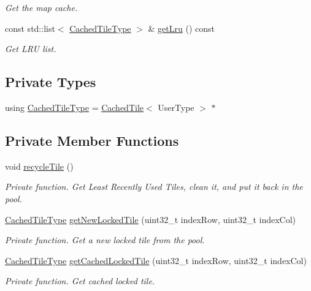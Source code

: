 \begin{DoxyCompactItemize}
\begin{DoxyCompactList}\small\item\em Get the map cache. \end{DoxyCompactList}\item 
const std\+::list$<$ \hyperlink{classfi_1_1FigCache_a7b9bbc4a832c01c3a461f573445c3c41}{Cached\+Tile\+Type} $>$ \& \hyperlink{classfi_1_1FigCache_a91dafec92a6f09fa3aa46d85328a0a30}{get\+Lru} () const
\begin{DoxyCompactList}\small\item\em Get L\+RU list. \end{DoxyCompactList}\end{DoxyCompactItemize}
\subsection*{Private Types}
\begin{DoxyCompactItemize}
\item 
using \hyperlink{classfi_1_1FigCache_a7b9bbc4a832c01c3a461f573445c3c41}{Cached\+Tile\+Type} = \hyperlink{classfi_1_1CachedTile}{Cached\+Tile}$<$ User\+Type $>$ $\ast$
\end{DoxyCompactItemize}
\subsection*{Private Member Functions}
\begin{DoxyCompactItemize}
\item 
void \hyperlink{classfi_1_1FigCache_a611074d024b48d548a84dbb08c97eb3d}{recycle\+Tile} ()
\begin{DoxyCompactList}\small\item\em Private function. Get Least Recently Used Tiles, clean it, and put it back in the pool. \end{DoxyCompactList}\item 
\hyperlink{classfi_1_1FigCache_a7b9bbc4a832c01c3a461f573445c3c41}{Cached\+Tile\+Type} \hyperlink{classfi_1_1FigCache_a407bf89cbbc37af734bf31709d382920}{get\+New\+Locked\+Tile} (uint32\+\_\+t index\+Row, uint32\+\_\+t index\+Col)
\begin{DoxyCompactList}\small\item\em Private function. Get a new locked tile from the pool. \end{DoxyCompactList}\item 
\hyperlink{classfi_1_1FigCache_a7b9bbc4a832c01c3a461f573445c3c41}{Cached\+Tile\+Type} \hyperlink{classfi_1_1FigCache_affc8808f55b290811485aecef22573e6}{get\+Cached\+Locked\+Tile} (uint32\+\_\+t index\+Row, uint32\+\_\+t index\+Col)
\begin{DoxyCompactList}\small\item\em Private function. Get cached locked tile. \end{DoxyCompactList}\end{DoxyCompactItemize}
